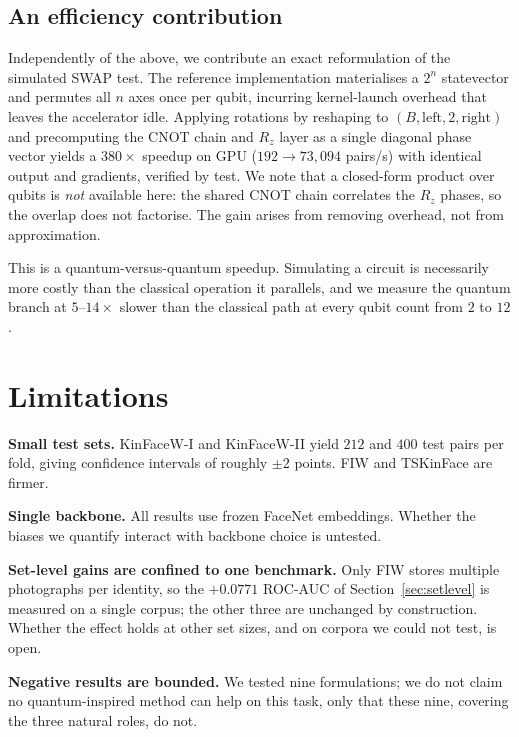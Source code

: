 \documentclass[journal,12pt]{IEEEtran}
\begin{document}
\subsection{An efficiency contribution}

Independently of the above, we contribute an exact reformulation of the
simulated SWAP test. The reference implementation materialises a $2^n$
statevector and permutes all $n$ axes once per qubit, incurring kernel-launch
overhead that leaves the accelerator idle. Applying rotations by reshaping to
$(B, \text{left}, 2, \text{right})$ and precomputing the CNOT chain and $R_z$
layer as a single diagonal phase vector yields a $380\times$ speedup on GPU
($192 \to 73{,}094$ pairs/s) with identical output and gradients, verified by
test. We note that a closed-form product over qubits is \emph{not} available
here: the shared CNOT chain correlates the $R_z$ phases, so the overlap does not
factorise. The gain arises from removing overhead, not from approximation.

This is a quantum-versus-quantum speedup. Simulating a circuit is necessarily
more costly than the classical operation it parallels, and we measure the
quantum branch at $5$--$14\times$ slower than the classical path at every qubit
count from $2$ to $12$.

\section{Limitations}
\label{sec:limitations}

\textbf{Small test sets.} KinFaceW-I and KinFaceW-II yield $212$ and $400$ test
pairs per fold, giving confidence intervals of roughly $\pm 2$ points. FIW and
TSKinFace are firmer.

\textbf{Single backbone.} All results use frozen FaceNet embeddings. Whether the
biases we quantify interact with backbone choice is untested.

\textbf{Set-level gains are confined to one benchmark.} Only FIW stores
multiple photographs per identity, so the $+0.0771$ ROC-AUC of
Section~\ref{sec:setlevel} is measured on a single corpus; the other three are
unchanged by construction. Whether the effect holds at other set sizes, and on
corpora we could not test, is open.

\textbf{Negative results are bounded.} We tested nine formulations; we do not
claim no quantum-inspired method can help on this task, only that these nine,
covering the three natural roles, do not.
\end{document}
